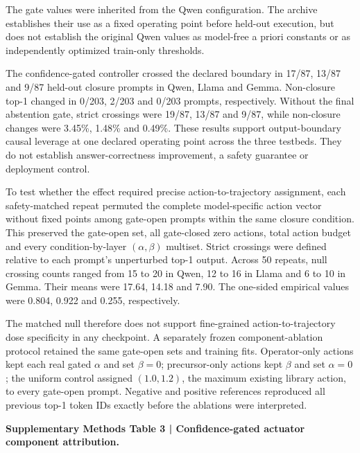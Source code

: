 \documentclass[10pt]{article}
\begin{document}
The gate values were inherited from the Qwen configuration. The archive establishes their use as a fixed operating point before held-out execution, but does not establish the original Qwen values as model-free a priori constants or as independently optimized train-only thresholds.

The confidence-gated controller crossed the declared boundary in 17/87, 13/87 and 9/87 held-out closure prompts in Qwen, Llama and Gemma. Non-closure top-1 changed in 0/203, 2/203 and 0/203 prompts, respectively. Without the final abstention gate, strict crossings were 19/87, 13/87 and 9/87, while non-closure changes were 3.45\%, 1.48\% and 0.49\%. These results support output-boundary causal leverage at one declared operating point across the three testbeds. They do not establish answer-correctness improvement, a safety guarantee or deployment control.

To test whether the effect required precise action-to-trajectory assignment, each safety-matched repeat permuted the complete model-specific action vector without fixed points among gate-open prompts within the same closure condition. This preserved the gate-open set, all gate-closed zero actions, total action budget and every condition-by-layer \((\alpha,\beta)\) multiset. Strict crossings were defined relative to each prompt's unperturbed top-1 output. Across 50 repeats, null crossing counts ranged from 15 to 20 in Qwen, 12 to 16 in Llama and 6 to 10 in Gemma. Their means were 17.64, 14.18 and 7.90. The one-sided empirical values were 0.804, 0.922 and 0.255, respectively.

The matched null therefore does not support fine-grained action-to-trajectory dose specificity in any checkpoint. A separately frozen component-ablation protocol retained the same gate-open sets and training fits. Operator-only actions kept each real gated \(\alpha\) and set \(\beta=0\); precursor-only actions kept \(\beta\) and set \(\alpha=0\); the uniform control assigned \((1.0,1.2)\), the maximum existing library action, to every gate-open prompt. Negative and positive references reproduced all previous top-1 token IDs exactly before the ablations were interpreted.

\textbf{Supplementary Methods Table 3 | Confidence-gated actuator component attribution.}
\end{document}
